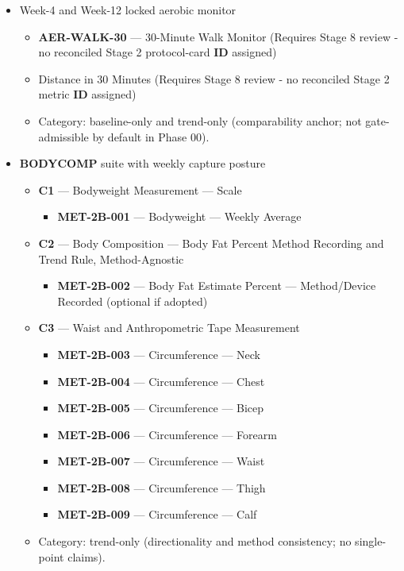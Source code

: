 \documentclass[10pt]{article}
\begin{document}
\begin{itemize}
\item Week-4 and Week-12 locked aerobic monitor
  \begin{itemize}
  \item \textbf{AER-WALK-30} — 30-Minute Walk Monitor (Requires Stage 8 review - no reconciled Stage 2 protocol-card \textbf{ID} assigned)
  \item Distance in 30 Minutes (Requires Stage 8 review - no reconciled Stage 2 metric \textbf{ID} assigned)
  \item Category: baseline-only and trend-only (comparability anchor; not gate-admissible by default in Phase 00).
  \end{itemize}

\item \textbf{BODYCOMP} suite with weekly capture posture
  \begin{itemize}
  \item \textbf{C1} — Bodyweight Measurement — Scale
    \begin{itemize}
    \item \textbf{MET-2B-001} — Bodyweight — Weekly Average
    \end{itemize}
  \item \textbf{C2} — Body Composition — Body Fat Percent Method Recording and Trend Rule, Method-Agnostic
    \begin{itemize}
    \item \textbf{MET-2B-002} — Body Fat Estimate Percent — Method/Device Recorded (optional if adopted)
    \end{itemize}
  \item \textbf{C3} — Waist and Anthropometric Tape Measurement
    \begin{itemize}
    \item \textbf{MET-2B-003} — Circumference — Neck
    \item \textbf{MET-2B-004} — Circumference — Chest
    \item \textbf{MET-2B-005} — Circumference — Bicep
    \item \textbf{MET-2B-006} — Circumference — Forearm
    \item \textbf{MET-2B-007} — Circumference — Waist
    \item \textbf{MET-2B-008} — Circumference — Thigh
    \item \textbf{MET-2B-009} — Circumference — Calf
    \end{itemize}
  \item Category: trend-only (directionality and method consistency; no single-point claims).
  \end{itemize}


\end{itemize}
\end{document}
